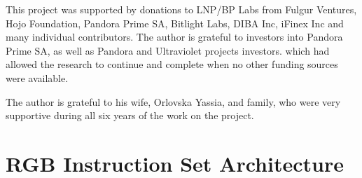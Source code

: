 \documentclass[9pt,oneside]{amsart}
\begin{document}
\begin{multicols}{2}
This project was supported by donations to LNP/BP Labs from Fulgur Ventures, Hojo Foundation,
Pandora Prime SA, Bitlight Labs, DIBA Inc, iFinex Inc and many individual contributors.
The author is grateful to investors into Pandora Prime SA,
as well as Pandora and Ultraviolet projects investors.
which had allowed the research to continue and complete
when no other funding sources were available.

The author is grateful to his wife, Orlovska Yassia, and family,
who were very supportive during all six years of the work on the project.





\end{multicols}

\newpage

\appendix
\section{RGB Instruction Set Architecture}\label{ap:ISA}
\end{document}
